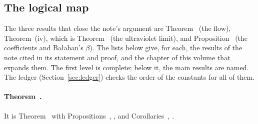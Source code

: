 \subsection{The logical map}\label{subsec:guide-map}

The three results that close the note's argument are Theorem~ (the flow), Theorem~(iv), which is Theorem~ (the ultraviolet limit), and Proposition~ (the coefficients and Ba\l aban's $\beta$). The lists below give, for each, the results of the note cited in its statement and proof, and the chapter of this volume that expands them. The first level is complete; below it, the main results are named. The ledger (Section~\ref{sec:ledger}) checks the order of the constants for all of them.

\paragraph{Theorem~.} It is Theorem~ with Propositions~, ,  and Corollaries~, .
